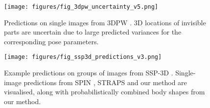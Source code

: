 \documentclass[final]{cvpr}
\begin{document}
\begin{figure}[t]
    \centering
    \texttt{[image: figures/fig\_3dpw\_uncertainty\_v5.png]}
    \caption{Predictions on single images from 3DPW \cite{vonMarcard2018}. 3D locations of invisible parts are uncertain due to large predicted variances for the corresponding pose parameters.}
    \label{fig:3dpw_uncertainty}
    \vspace{-0.4cm}
\end{figure}

\begin{figure}[t]
    \centering
    \texttt{[image: figures/fig\_ssp3d\_predictions\_v3.png]}
    \caption{Example predictions on groups of images from SSP-3D \cite{STRAPS2020BMVC}. Single-image predictions from SPIN \cite{kolotouros2019spin}, STRAPS \cite{STRAPS2020BMVC} and our method are visualised, along with probabilistically combined body shapes from our method.}
    \label{fig:ssp3d_predictions}
    \vspace{-0.4cm}
\end{figure}
\end{document}
